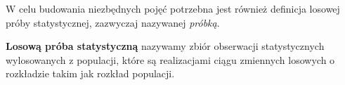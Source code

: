 W celu budowania niezbędnych pojęć potrzebna jest również definicja losowej próby statystycznej, zazwyczaj nazywanej \textit{próbką}.

\begin{definition}
 \textbf{Losową próba statystyczną} nazywamy zbiór obserwacji statystycznych wylosowanych z populacji, które są realizacjami ciągu zmiennych losowych o rozkładzie takim jak rozkład populacji.
 \end{definition}
